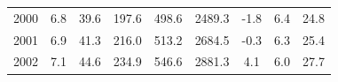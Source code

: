 \documentclass[openany]{book}
\begin{document}
\begin{table}[htbp]
{\begin{tabular}{ccccccccc}
\rowcolor[HTML]{F8F9FA} 
{\color[HTML]{202122} 2000}        & {\color[HTML]{202122} 6.8}                                                                  & {\color[HTML]{202122} 39.6}                                                                         & {\color[HTML]{202122} 197.6}                                                                    & {\color[HTML]{202122} 498.6}                                                                               & {\color[HTML]{202122} 2489.3}                                                                          & {\color[HTML]{202122} -1.8}                                                                           & {\color[HTML]{202122} 6.4}                                                                               & {\color[HTML]{202122} 24.8}                                                                              \\
\rowcolor[HTML]{F8F9FA} 
{\color[HTML]{202122} 2001}        & {\color[HTML]{202122} 6.9}                                                                  & {\color[HTML]{202122} 41.3}                                                                         & {\color[HTML]{202122} 216.0}                                                                    & {\color[HTML]{202122} 513.2}                                                                               & {\color[HTML]{202122} 2684.5}                                                                          & {\color[HTML]{202122} -0.3}                                                                           & {\color[HTML]{202122} 6.3}                                                                               & {\color[HTML]{202122} 25.4}                                                                              \\
\rowcolor[HTML]{F8F9FA} 
{\color[HTML]{202122} 2002}        & {\color[HTML]{202122} 7.1}                                                                  & {\color[HTML]{202122} 44.6}                                                                         & {\color[HTML]{202122} 234.9}                                                                    & {\color[HTML]{202122} 546.6}                                                                               & {\color[HTML]{202122} 2881.3}                                                                          & {\color[HTML]{202122} 4.1}                                                                            & {\color[HTML]{202122} 6.0}                                                                               & {\color[HTML]{202122} 27.7}                                                                              \\

\end{tabular}}
\end{table}
\end{document}
